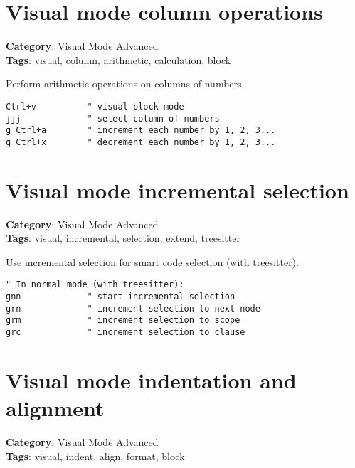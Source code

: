 {{{{{{{{{{{{{{{{{{\section{Visual mode column operations}

\textbf{Category}: Visual Mode Advanced\\ \textbf{Tags}: visual, column, arithmetic, calculation, block
\vspace{0.5cm}

Perform arithmetic operations on columns of numbers.

\begin{Exa*}{}
\begin{Verbatim}[fontsize=\footnotesize, breaklines, breakanywhere]
Ctrl+v          " visual block mode
jjj             " select column of numbers
g Ctrl+a        " increment each number by 1, 2, 3...
g Ctrl+x        " decrement each number by 1, 2, 3...
\end{Verbatim}
\end{Exa*}

\section{Visual mode incremental selection}

\textbf{Category}: Visual Mode Advanced\\ \textbf{Tags}: visual, incremental, selection, extend, treesitter
\vspace{0.5cm}

Use incremental selection for smart code selection (with treesitter).

\begin{Exa*}{}
\begin{Verbatim}[fontsize=\footnotesize, breaklines, breakanywhere]
" In normal mode (with treesitter):
gnn             " start incremental selection
grn             " increment selection to next node
grm             " increment selection to scope
grc             " increment selection to clause
\end{Verbatim}
\end{Exa*}

\section{Visual mode indentation and alignment}

\textbf{Category}: Visual Mode Advanced\\ \textbf{Tags}: visual, indent, align, format, block
\vspace{0.5cm}

}}}}}}}}}}}}}}}}}}
